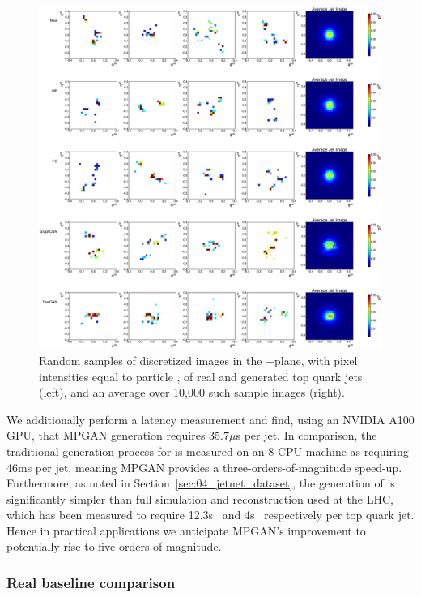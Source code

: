 \begin{figure}[htpb]
    \centering
    \centerline{\includegraphics[width=\textwidth]{figures/04-ML4Sim/mpgan/results/jet_images_t.pdf}}
    \caption{Random samples of discretized images in the \etarel$-$\phirel plane, with pixel intensities equal to particle \ptrel, of real and generated top quark jets (left), and an average over 10,000 such sample images (right).}
    \label{fig:04_mpgan_jetims_t}
\end{figure}

We additionally perform a latency measurement and find, using an NVIDIA A100 GPU, that MPGAN generation requires $35.7\mu$s per jet. 
In comparison, the traditional generation process for \jetnet is measured on an 8-CPU machine as requiring 46ms per jet, meaning MPGAN provides a three-orders-of-magnitude speed-up.
Furthermore, as noted in Section~\ref{sec:04_jetnet_dataset}, the generation of \jetnet is significantly simpler than full simulation and reconstruction used at the LHC, which has been measured to require 12.3s~\cite{Pedro:2018jqu} and 4s~\cite{chen2020data} respectively per top quark jet. 
Hence in practical applications we anticipate MPGAN's improvement to potentially rise to five-orders-of-magnitude.


\subsubsection{Real baseline comparison}

